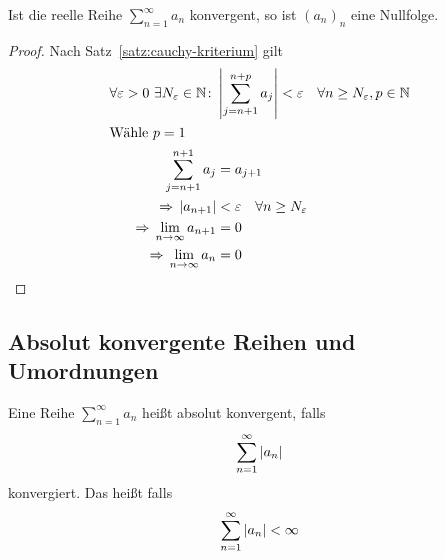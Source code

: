 \begin{korollar} %
    \label{korollar:folge-von-reihe-nullfolge}
    Ist die reelle Reihe $\sum_{n=1}^{\infty} a_n$ konvergent, so ist $(a_n)_n$ eine Nullfolge.
    \begin{proof}
        Nach Satz~\ref{satz:cauchy-kriterium} gilt
        \begin{align*}
            \forall \varepsilon > 0~\exists N_{\varepsilon}\in\mathbb{N}\colon &\left\lvert\sum_{j=n+1}^{n+p} a_j\right\rvert < \varepsilon\quad\forall n\geq N_{\varepsilon}, p\in\mathbb{N}\\
            \intertext{Wähle $p=1$}
            \sum_{j=n+1}^{n+1} a_{j} &= a_{j+1}\\
            \Rightarrow{} \left\lvert a_{n+1}\right\rvert &< \varepsilon\quad \forall n\geq N_{\varepsilon}\\
            \Rightarrow{} \lim_{n\rightarrow{}\infty} a_{n+1} &= 0\\
            \Rightarrow{} \lim_{n\rightarrow{}\infty} a_{n} &= 0\qedhere
        \end{align*}
    \end{proof}
\end{korollar}

\newpage

\subsection{Absolut konvergente Reihen und Umordnungen}

\begin{definition} %
    Eine Reihe $\displaystyle\sum_{n=1}^{\infty} a_n$ heißt absolut konvergent, falls
    \begin{align*}
        \sum_{n=1}^{\infty} \left\lvert a_n\right\rvert
    \end{align*}
    konvergiert. Das heißt falls
    \begin{align*}
        \sum_{n=1}^{\infty} \left\lvert a_n\right\rvert < \infty
    \end{align*}
\end{definition}

